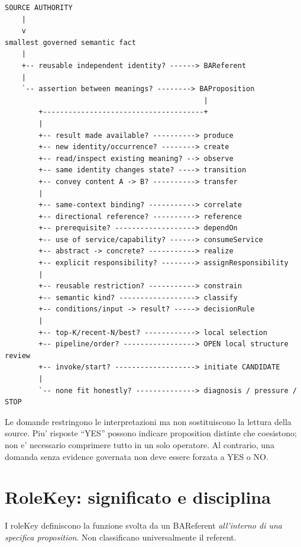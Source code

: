 \documentclass[11pt,a4paper]{article}
\providecommand{\stabletag}{\ddtatag{DDTAGreen}{CURRENT / PRESERVED}}
\begin{document}
\begin{lstlisting}
SOURCE AUTHORITY
    |
    v
smallest governed semantic fact
    |
    +-- reusable independent identity? ------> BAReferent
    |
    `-- assertion between meanings? --------> BAProposition
                                               |
        +--------------------------------------+
        |
        +-- result made available? ----------> produce
        +-- new identity/occurrence? --------> create
        +-- read/inspect existing meaning? --> observe
        +-- same identity changes state? ----> transition
        +-- convey content A -> B? ----------> transfer
        |
        +-- same-context binding? -----------> correlate
        +-- directional reference? ----------> reference
        +-- prerequisite? -------------------> dependOn
        +-- use of service/capability? ------> consumeService
        +-- abstract -> concrete? -----------> realize
        +-- explicit responsibility? --------> assignResponsibility
        |
        +-- reusable restriction? -----------> constrain
        +-- semantic kind? ------------------> classify
        +-- conditions/input -> result? -----> decisionRule
        |
        +-- top-K/recent-N/best? ------------> local selection
        +-- pipeline/order? -----------------> OPEN local structure review
        +-- invoke/start? -------------------> initiate CANDIDATE
        |
        `-- none fit honestly? --------------> diagnosis / pressure / STOP
\end{lstlisting}

\begin{ddtaanti}[title={Question pack != automatic classifier}]
Le domande restringono le interpretazioni ma non sostituiscono la lettura della source. Piu' risposte ``YES'' possono indicare proposition distinte che coesistono; non e' necessario comprimere tutto in un solo operatore. Al contrario, una domanda senza evidence governata non deve essere forzata a YES o NO.
\end{ddtaanti}


\section{RoleKey: significato e disciplina}
\stabletag

I roleKey definiscono la funzione svolta da un BAReferent \emph{all'interno di una specifica proposition}. Non classificano universalmente il referent.
\end{document}
